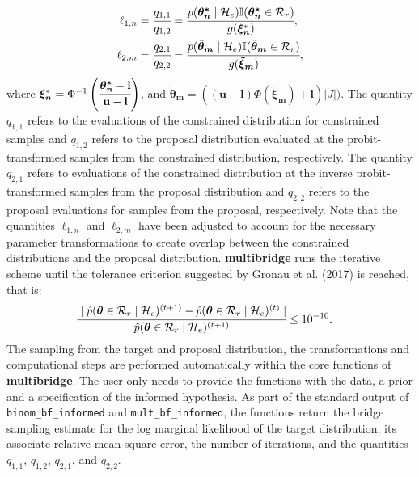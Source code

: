 \documentclass[
  english,
  man,floatsintext]{apa6}
\begin{document}
\begin{align}
    \ell_{1,n} &= \cfrac{q_{1,1}}{q_{1,2}}  = \cfrac{p(\boldsymbol{\theta^*_n}\mid \mathcal{H}_e) \mathbb{I}(\boldsymbol{\theta^*_n}\in\mathcal{R}_r)}{g(\boldsymbol{\xi_n}^*)},\\
    \ell_{2,m} &= \cfrac{q_{2,1}}{q_{2,2}} = \cfrac{p(\boldsymbol{\tilde \theta_m}\mid \mathcal{H}_e) \mathbb{I}(\boldsymbol{\tilde \theta_m}\in\mathcal{R}_r)}{g(\boldsymbol{\tilde \xi_m})},
\end{align}
where \(\boldsymbol{\xi_n}^* = \Phi^{-1}\left(\cfrac{\boldsymbol{\theta^*_n} - \mathbf{l}}{\mathbf{u} - \mathbf{l}}\right)\), and \(\boldsymbol{\tilde \theta_m} = ((\mathbf{u} - \mathbf{l})\Phi(\boldsymbol{\tilde \xi_m}) + \mathbf{l}) \left|J\right|)\). The quantity \(q_{1,1}\) refers to the evaluations of the constrained distribution for constrained samples and \(q_{1,2}\) refers to the proposal distribution evaluated at the probit-transformed samples from the constrained distribution, respectively. The quantity \(q_{2,1}\) refers to evaluations of the constrained distribution at the inverse probit-transformed samples from the proposal distribution and \(q_{2,2}\) refers to the proposal evaluations for samples from the proposal, respectively. Note that the quantities \(\ell_{1,n}\) and \(\ell_{2,m}\) have been adjusted to account for the necessary parameter transformations to create overlap between the constrained distributions and the proposal distribution. \textbf{multibridge} runs the iterative scheme until the tolerance criterion suggested by Gronau et al. (2017) is reached, that is:
\begin{align*}
\cfrac{\mid \hat p(\boldsymbol{\theta} \in \mathcal{R}_r \mid \mathcal{H}_e)^{(t + 1)} - \hat p(\boldsymbol{\theta} \in \mathcal{R}_r \mid \mathcal{H}_e)^{(t)} \mid}{\hat p(\boldsymbol{\theta} \in \mathcal{R}_r \mid \mathcal{H}_e)^{(t + 1)}} &\leq 10^{-10}.
\end{align*}
The sampling from the target and proposal distribution, the transformations and computational steps are performed automatically within the core functions of \textbf{multibridge}. The user only needs to provide the functions with the data, a prior and a specification of the informed hypothesis. As part of the standard output of \texttt{binom\_bf\_informed} and \texttt{mult\_bf\_informed}, the functions return the bridge sampling estimate for the log marginal likelihood of the target distribution, its associate relative mean square error, the number of iterations, and the quantities \(q_{1,1}\), \(q_{1,2}\), \(q_{2,1}\), and \(q_{2,2}\).
\end{document}
